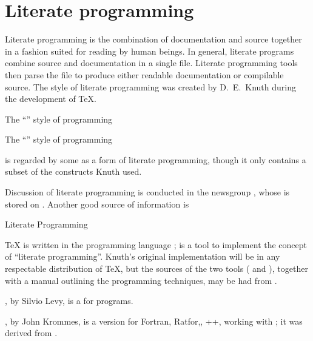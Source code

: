 
\section{Literate programming}


Literate programming is the combination of documentation and source
together in a fashion suited for reading by human beings. 
In general, literate programs combine source
and documentation in a single file.  Literate programming tools then
parse the file to produce either readable documentation or compilable
source.  The  style of literate programming was created by
D.~E.~Knuth during the development of \TeX{}.

\htmlignore
The ``'' style of programming
\endhtmlignore
\begin{htmlversion}
  The ``'' style of programming
\end{htmlversion}
is regarded by some as a form of literate programming, though it only
contains a subset of the constructs Knuth used.

Discussion of literate programming is conducted in the newsgroup
, whose  is stored on
.  Another good source of information is
\begin{ctanrefs}
\item[\nothtml{\rmfamily}Literate Programming \acro{FAQ}]%
\end{ctanrefs}


\TeX{} is written in the programming language ; 
is a tool to implement the concept of ``literate programming''.
Knuth's original implementation will be in any respectable
distribution of \TeX{}, but the sources of the two tools
( and ), together with a manual
outlining the programming techniques, may be had from .

, by Silvio Levy, is a  for  programs.

, by John Krommes, is a version for Fortran,
Ratfor,, ++, working with \latex{}; it was derived
from .

